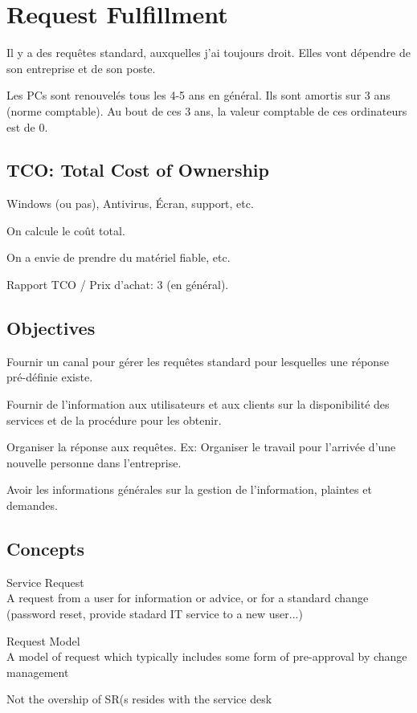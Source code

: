 \documentclass[a4paper,11pt]{article}
\begin{document}
\section{Request Fulfillment}

Il y a des requêtes standard, auxquelles j'ai toujours droit. Elles vont
dépendre de son entreprise et de son poste.

Les PCs sont renouvelés tous les 4-5 ans en général. Ils sont amortis sur 3 ans
(norme comptable). Au bout de ces 3 ans, la valeur comptable de ces ordinateurs
est de 0.

\subsection{TCO: Total Cost of Ownership}

Windows (ou pas), Antivirus, Écran, support, etc.

On calcule le coût total.

On a envie de prendre du matériel fiable, etc.

Rapport TCO / Prix d'achat: 3 (en général).

\subsection{Objectives}

Fournir un canal pour gérer les requêtes standard pour lesquelles une réponse
pré-définie existe.

Fournir de l'information aux utilisateurs et aux clients sur la disponibilité
des services et de la procédure pour les obtenir.

Organiser la réponse aux requêtes. Ex: Organiser le travail pour l'arrivée d'une
nouvelle personne dans l'entreprise.

Avoir les informations générales sur la gestion de l'information, plaintes et
demandes.

\subsection{Concepts}

Service Request\\
A request from a user for information or advice, or for a standard change
(password reset, provide stadard IT service to a new user...)

Request Model \\
A model of request which typically includes some form of pre-approval by change
management

Not the overship of SR(s resides with the service desk
\end{document}
